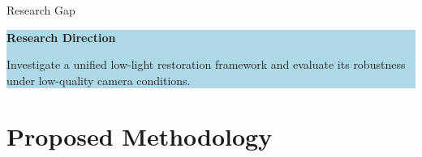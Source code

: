 ﻿\documentclass[
    11pt,%
    aspectratio=169,%
]{beamer}
\begin{document}
\begin{frame}{Research Gap}
\begin{center}

\end{center}

\vspace{0.22cm}


\begin{beamercolorbox}[
    rounded=true,
    sep=0.08cm,
    wd=\textwidth
]{}

\colorbox{LightBlue}{
    \parbox{\dimexpr\textwidth-2\fboxsep\relax}{
        {\color{Navy}\bfseries
        Research Direction}

        \vspace{0.05cm}

        \fontsize{9}{11}\selectfont

        Investigate a unified low-light restoration
        framework and evaluate its robustness
        under low-quality camera conditions.
    }
}

\end{beamercolorbox}

\end{frame}

\section{Proposed Methodology}
\end{document}
